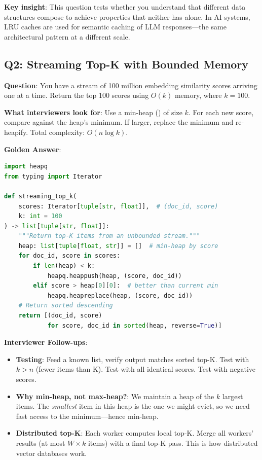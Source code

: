 \textbf{Key insight}: This question tests whether you understand that different data structures compose to achieve properties that neither has alone. In AI systems, LRU caches are used for semantic caching of LLM responses---the same architectural pattern at a different scale.


\subsection{Q2: Streaming Top-K with Bounded Memory}

\textbf{Question}: You have a stream of 100 million embedding similarity scores arriving one at a time. Return the top 100 scores using $O(k)$ memory, where $k = 100$.

\textbf{What interviewers look for}: Use a min-heap () of size $k$. For each new score, compare against the heap's minimum. If larger, replace the minimum and re-heapify. Total complexity: $O(n \log k)$.

\textbf{Golden Answer}:

\begin{lstlisting}[language=Python]
import heapq
from typing import Iterator

def streaming_top_k(
    scores: Iterator[tuple[str, float]],  # (doc_id, score)
    k: int = 100
) -> list[tuple[str, float]]:
    """Return top-K items from an unbounded stream."""
    heap: list[tuple[float, str]] = []  # min-heap by score
    for doc_id, score in scores:
        if len(heap) < k:
            heapq.heappush(heap, (score, doc_id))
        elif score > heap[0][0]:  # better than current min
            heapq.heapreplace(heap, (score, doc_id))
    # Return sorted descending
    return [(doc_id, score)
            for score, doc_id in sorted(heap, reverse=True)]
\end{lstlisting}

\textbf{Interviewer Follow-ups}:
\begin{itemize}[leftmargin=*]
    \item \textbf{Testing}: Feed a known list, verify output matches sorted top-K. Test with $k > n$ (fewer items than K). Test with all identical scores. Test with negative scores.
    \item \textbf{Why min-heap, not max-heap?}: We maintain a heap of the $k$ largest items. The \emph{smallest} item in this heap is the one we might evict, so we need fast access to the minimum---hence min-heap.
    \item \textbf{Distributed top-K}: Each worker computes local top-K. Merge all workers' results (at most $W \times k$ items) with a final top-K pass. This is how distributed vector databases work.
\end{itemize}

